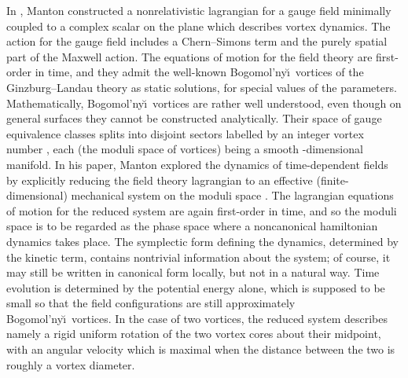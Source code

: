 \documentclass[a4paper,11pt]{article}
\begin{document}
In \cite{Mfovd}, Manton constructed a nonrelativistic lagrangian
for a \coordHE{} gauge field minimally coupled to a complex scalar on the
plane which 
describes vortex dynamics. The action for the gauge field 
includes a Chern--Simons term and the purely spatial part of the
Maxwell action. The equations of motion for the field theory 
are first-order in time, and 
they admit the well-known Bogomol'ny\u \i\ vortices \cite{JT} of the 
Ginzburg--Landau theory as static solutions, for special values of the
parameters. Mathematically, Bogomol'ny\u\i\ vortices are rather well 
understood, even though on general surfaces they cannot be constructed
analytically. 
Their space of gauge equivalence classes splits into disjoint 
sectors \coordHE{}
labelled by an integer vortex number \coordHE{}, each \coordHE{}
(the moduli space of \coordHE{} vortices) being a smooth \coordHE{}-dimensional manifold.
In his paper, Manton explored the dynamics of time-dependent fields by 
explicitly reducing the field theory lagrangian to an effective 
(finite-dimensional) mechanical system on the moduli space \coordHE{}.
The lagrangian equations of motion for the reduced system
are again first-order in time, 
and so the moduli space is to be regarded as the phase space where a 
noncanonical hamiltonian dynamics takes
place. The symplectic form defining the dynamics, determined by the
kinetic term, contains nontrivial 
information about the system; of course, it may still be written in 
canonical form locally, but not in a natural way.
Time evolution is determined by the potential energy alone, which is
supposed to be small so that the field configurations are still
approximately Bogomol'ny\u\i\ vortices.
In the case of two vortices, the reduced system describes namely a
rigid uniform 
rotation of the two vortex cores about their midpoint, with an angular 
velocity which is maximal when the distance between the two is roughly
a vortex diameter.
\end{document}
